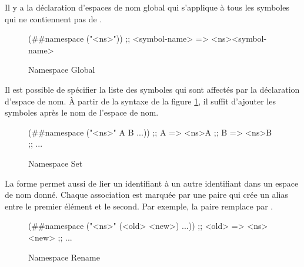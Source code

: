 Il y a la déclaration d'espaces de nom global qui s'applique à tous les
symboles qui ne contiennent pas de \lstcode{#}. \\[1ex]
\begin{figure}[ht]
  \centering
  \begin{mplisting}{0.6}
(##namespace ("<ns>"))
;; <symbol-name> => <ns><symbol-name>
\end{mplisting}
  \caption{Namespace Global}
  \label{fig:forms->namespace-global}
\end{figure}

Il est possible de spécifier la liste des symboles qui sont affectés par la
déclaration d'espace de nom. À partir de la syntaxe de la figure
\ref{fig:forms->namespace-global}, il suffit d'ajouter les symboles après le nom
de l'espace de nom.\\[1ex]
\begin{figure}[ht]
  \centering
  \fontsize{12}{10}
  \begin{mplisting}{0.6}
(##namespace ("<ns>" A B ...))
;; A => <ns>A
;; B => <ns>B
;; ...
\end{mplisting}
  \caption{Namespace Set}
  \label{fig:forms->namespace-set}
\end{figure}

La forme  permet aussi de lier un identifiant à un
autre identifiant dans un espace de nom donné. Chaque association est marquée
par une paire qui crée un alias entre le premier élément et le second. Par exemple,
la paire  remplace  par .
\\[1ex]
\begin{figure}[ht]
  \centering
  \fontsize{12}{10}
  \begin{mplisting}{0.6}
(##namespace ("<ns>" (<old> <new>) ...))
;; <old> => <ns><new>
;; ...
\end{mplisting}
  \caption{Namespace Rename}
  \label{fig:forms->namespace-rename}
\end{figure}



